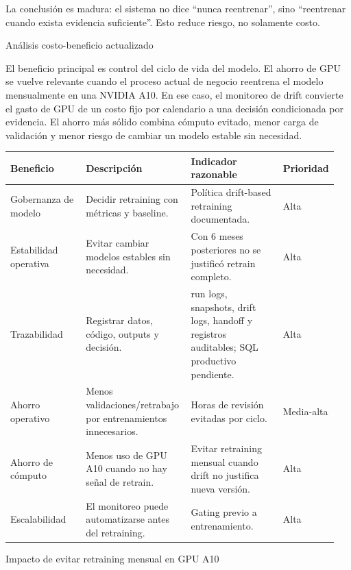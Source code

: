 \documentclass[11pt,letterpaper]{article}
\makeatletter
\renewcommand\section{\@startsection{section}{1}{\z@}
  {-3.5ex \@plus -1ex \@minus -.2ex}
  {2.3ex \@plus .2ex}
  {\Large\bfseries\sffamily\color{azulTec}}}
\renewcommand\subsection{\@startsection{subsection}{2}{\z@}
  {-3.25ex \@plus -1ex \@minus -.2ex}
  {1.5ex \@plus .2ex}
  {\large\bfseries\sffamily\color{azulTec}}}
\makeatother
\begin{document}
La conclusión es madura: el sistema no dice ``nunca reentrenar'', sino ``reentrenar cuando exista evidencia suficiente''. Esto reduce riesgo, no solamente costo.

\section{Análisis costo-beneficio actualizado}

El beneficio principal es control del ciclo de vida del modelo. El ahorro de GPU se vuelve relevante cuando el proceso actual de negocio reentrena el modelo mensualmente en una NVIDIA A10. En ese caso, el monitoreo de drift convierte el gasto de GPU de un costo fijo por calendario a una decisión condicionada por evidencia. El ahorro más sólido combina cómputo evitado, menor carga de validación y menor riesgo de cambiar un modelo estable sin necesidad.

\begin{tabularx}{\linewidth}{L{0.23\linewidth}L{0.32\linewidth}L{0.28\linewidth}L{0.12\linewidth}}
\toprule
\textbf{Beneficio} & \textbf{Descripción} & \textbf{Indicador razonable} & \textbf{Prioridad} \\
\midrule
Gobernanza de modelo & Decidir retraining con métricas y baseline. & Política drift-based retraining documentada. & Alta \\
Estabilidad operativa & Evitar cambiar modelos estables sin necesidad. & Con 6 meses posteriores no se justificó retrain completo. & Alta \\
Trazabilidad & Registrar datos, código, outputs y decisión. & run logs, snapshots, drift logs, handoff y registros auditables; SQL productivo pendiente. & Alta \\
Ahorro operativo & Menos validaciones/retrabajo por entrenamientos innecesarios. & Horas de revisión evitadas por ciclo. & Media-alta \\
Ahorro de cómputo & Menos uso de GPU A10 cuando no hay señal de retrain. & Evitar retraining mensual cuando drift no justifica nueva versión. & Alta \\
Escalabilidad & El monitoreo puede automatizarse antes del retraining. & Gating previo a entrenamiento. & Alta \\
\bottomrule
\end{tabularx}

\subsection{Impacto de evitar retraining mensual en GPU A10}
\end{document}
